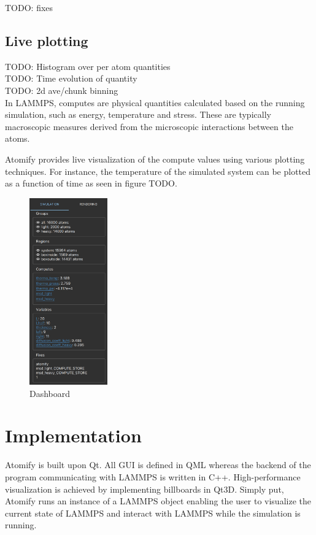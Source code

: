 \documentclass[aps,pre,twocolumn,letterpaper,floatfix,nofootinbib]{revtex4}
\begin{document}
TODO: fixes \\

\subsection{Live plotting}
TODO: Histogram over per atom quantities \\
TODO: Time evolution of quantity \\
TODO: 2d ave/chunk binning \\

In LAMMPS, computes are physical quantities calculated based on the running
simulation, such as energy, temperature and stress.
These are typically macroscopic measures derived from the microscopic
interactions between the atoms.

Atomify provides live visualization of the compute values using various plotting
techniques.
For instance, the temperature of the simulated system can be plotted as a
function of time as seen in figure TODO.

\begin{figure}
	\centering
	\includegraphics[width=0.3\textwidth]{dashboard.png}
	\caption{Dashboard}
	\label{fig:gui}
\end{figure}


\section{Implementation}

Atomify is built upon Qt.
All GUI is defined in QML whereas the backend of the program communicating with
LAMMPS is written in C++.
High-performance visualization is achieved by implementing billboards in Qt3D.
Simply put, Atomify runs an instance of a LAMMPS object enabling the user to
visualize the current state of LAMMPS and interact with LAMMPS while the
simulation is running. 
\end{document}
